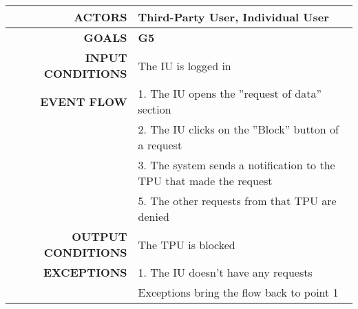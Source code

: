\begin{table}[h!]
\begin{tabular}{|r|p{3in}|}
\hline
\textbf{ACTORS} & Third-Party User, Individual User\\
\hline
\textbf{GOALS} & \textbf{G5}\\
\hline
\textbf{INPUT CONDITIONS} & The IU is logged in\\
\hline
\textbf{EVENT FLOW} 
&1. The IU opens the ''request of data'' section \\
&2. The IU clicks on the ''Block'' button of a request \\
&3. The system sends a notification to the TPU that made the request \\
&5. The other requests from that TPU are denied\\
\hline
\textbf{OUTPUT CONDITIONS} & The TPU is blocked \\
\hline
\textbf{EXCEPTIONS} 
&1. The IU doesn't have any requests \\
&Exceptions bring the flow back to point 1 \\
\hline
\end{tabular}
\end{table}